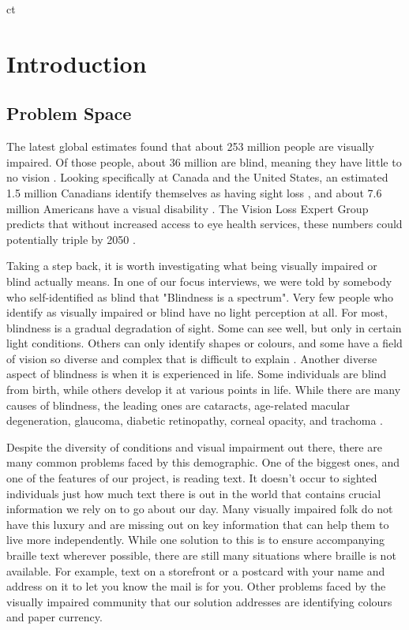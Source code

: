 ct\documentclass[a4paper,11pt]{article}
\begin{document}
\newpage

\tableofcontents

\newpage

\section{Introduction}
\subsection{Problem Space}
The latest global estimates found that about 253 million people are visually impaired. Of those people, about 36 million are blind, meaning they have little to no vision \cite{orbis-global-blind-data}. Looking specifically at Canada and the United States, an estimated 1.5 million Canadians identify themselves as having sight loss \cite{cnib-blind-data}, and about 7.6 million Americans have a visual disability \cite{nfb-blind-data}. The Vision Loss Expert Group predicts that without increased access to eye health services, these numbers could potentially triple by 2050 \cite{orbis-global-blind-data}.

Taking a step back, it is worth investigating what being visually impaired or blind actually means. In one of our focus interviews, we were told by somebody who self-identified as blind that "Blindness is a spectrum". Very few people who identify as visually impaired or blind have no light perception at all. For most, blindness is a gradual degradation of sight. Some can see well, but only in certain light conditions. Others can only identify shapes or colours, and some have a field of vision so diverse and complex that is difficult to explain \cite{lighthouse-sf-info-page}. Another diverse aspect of blindness is when it is experienced in life. Some individuals are blind from birth, while others develop it at various points in life. While there are many causes of blindness, the leading ones are cataracts, age-related macular degeneration, glaucoma, diabetic retinopathy, corneal opacity, and trachoma \cite{WHO-blindness}.

Despite the diversity of conditions and visual impairment out there, there are many common problems faced by this demographic. One of the biggest ones, and one of the features of our project, is reading text. It doesn't occur to sighted individuals just how much text there is out in the world that contains crucial information we rely on to go about our day. Many visually impaired folk do not have this luxury and are missing out on key information that can help them to live more independently. While one solution to this is to ensure accompanying braille text wherever possible, there are still many situations where braille is not available. For example, text on a storefront or a postcard with your name and address on it to let you know the mail is for you. Other problems faced by the visually impaired community that our solution addresses are identifying colours and paper currency.
\end{document}
